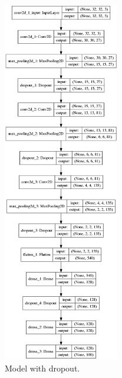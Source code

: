 \documentclass[]{article}
\begin{document}
\begin{figure}[H]
	\centering
	\includegraphics[width=0.45\textwidth]{dropout}
	\caption{Model with dropout.}
	\label{f:drop1}
\end{figure}
\end{document}

